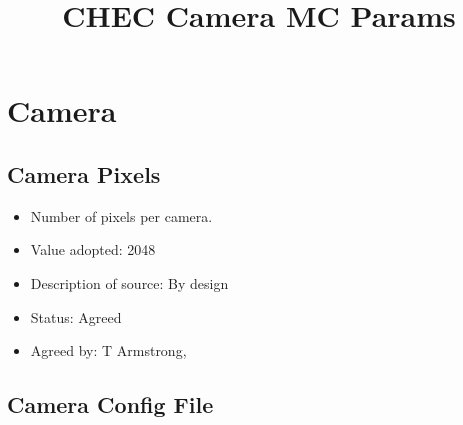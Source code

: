 \documentclass[GCT,short]{gct}
\begin{document}
\title{CHEC Camera MC Params}





\maketitle
\FloatBarrier\if@openright\cleardoublepage\else\clearpage\fi

\maketoc



\chapter{Camera}

\section{Camera Pixels}
\begin{itemize}
\item Number of pixels per camera.
\item Value adopted: 2048
\item Description of source: By design
\item Status: Agreed
\item Agreed by: T Armstrong, 
\end{itemize}


\section{Camera Config File }
\end{document}
